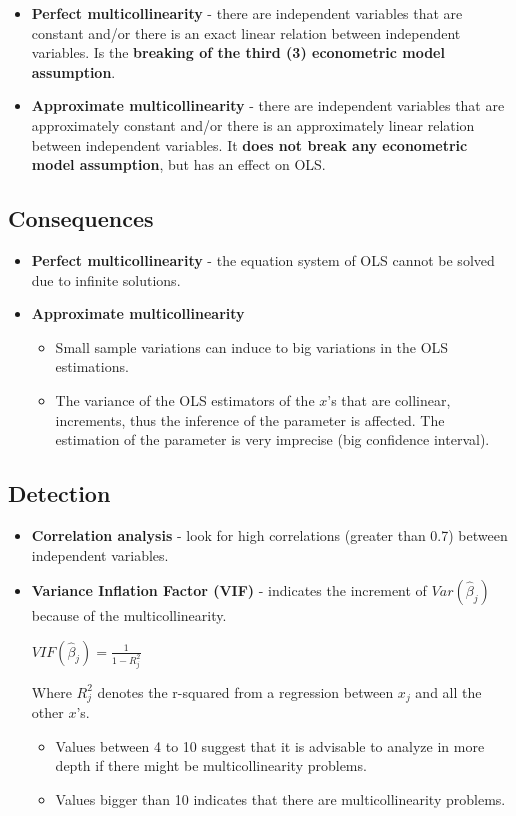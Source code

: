 \documentclass[10pt, a4paper, landscape]{extarticle}
\begin{document}
\begin{multicols}{3}
\begin{itemize}[leftmargin=*]
\item \textbf{Perfect multicollinearity} - there are independent variables that are constant and/or there is an exact linear relation between independent variables. Is the \textbf{breaking of the third (3) econometric model assumption}.
\item \textbf{Approximate multicollinearity} - there are independent variables that are approximately constant and/or there is an approximately linear relation between independent variables. It \textbf{does not break any econometric model assumption}, but has an effect on OLS.
\end{itemize}

\subsection*{Consequences}

\begin{itemize}[leftmargin=*]
\item \textbf{Perfect multicollinearity} - the equation system of OLS cannot be solved due to infinite solutions.
\item \textbf{Approximate multicollinearity}
\begin{itemize}[leftmargin=*]
\item Small sample variations can induce to big variations in the OLS estimations.
\item The variance of the OLS estimators of the $x$'s that are collinear, increments, thus the inference of the parameter is affected. The estimation of the parameter is very imprecise (big confidence interval).
\end{itemize}
\end{itemize}

\subsection*{Detection}

\begin{itemize}[leftmargin=*]
\item \textbf{Correlation analysis} - look for high correlations (greater than 0.7) between independent variables.
\item \textbf{Variance Inflation Factor (VIF)} - indicates the increment of $Var(\hat{\beta}_j)$ because of the multicollinearity.
\begin{center}
$VIF(\hat{\beta}_j) = \frac{1}{1-R_j^2}$
\end{center}
Where $R^2_j$ denotes the r-squared from a regression between $x_j$ and all the other $x$'s. 
\begin{itemize}[leftmargin=*]
\item Values between 4 to 10 suggest that it is advisable to analyze in more depth if there might be multicollinearity problems.
\item Values bigger than 10 indicates that there are multicollinearity problems.
\end{itemize}
\end{itemize}


\end{multicols}
\end{document}

